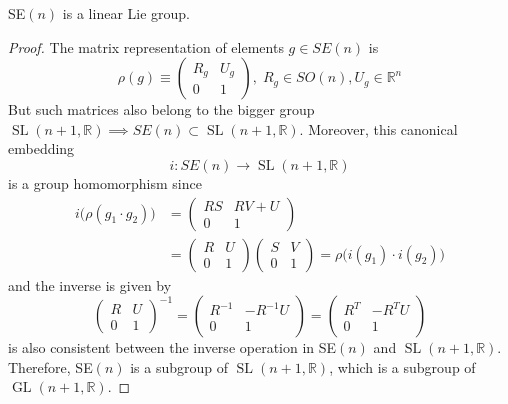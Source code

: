 \documentclass{article}
\DeclareMathOperator{\GL}{GL}
\DeclareMathOperator{\SL}{SL}
\begin{document}
    \begin{proposition}
      SE$(n)$ is a linear Lie group. 
    \end{proposition}
    \begin{proof}
      The matrix representation of elements $g \in SE(n)$ is 
      \begin{equation}
        \rho(g) \equiv \begin{pmatrix}
        R_g & U_g \\ 0 & 1
        \end{pmatrix}, \; R_g \in SO(n), U_g \in \mathbb{R}^n
      \end{equation}
      But such matrices also belong to the bigger group $\SL(n+1, \mathbb{R}) \implies SE(n) \subset \SL(n+1, \mathbb{R})$. Moreover, this canonical embedding 
      \begin{equation}
        i: SE(n) \longrightarrow \SL(n+1, \mathbb{R})
      \end{equation}
      is a group homomorphism since
      \begin{align*}
        i\big( \rho(g_1 \cdot g_2) \big) & = \begin{pmatrix}
        RS & RV + U \\ 0 & 1
        \end{pmatrix} \\
        & = \begin{pmatrix}
        R & U \\ 0 & 1
        \end{pmatrix} \begin{pmatrix}
        S & V \\ 0 & 1
        \end{pmatrix} = \rho \big( i(g_1) \cdot i(g_2) \big) 
      \end{align*}
      and the inverse is given by 
      \begin{equation}
        \begin{pmatrix}
        R & U \\ 0 & 1
        \end{pmatrix}^{-1} = \begin{pmatrix}
        R^{-1} & - R^{-1} U \\ 0 & 1
        \end{pmatrix} = \begin{pmatrix}
        R^T & - R^T U \\ 0 & 1
        \end{pmatrix}
      \end{equation}
      is also consistent between the inverse operation in SE$(n)$ and $\SL(n+1, \mathbb{R})$. Therefore, SE$(n)$ is a subgroup of $\SL(n+1, \mathbb{R})$, which is a subgroup of $\GL(n+1, \mathbb{R})$. 
    \end{proof}
\end{document}
